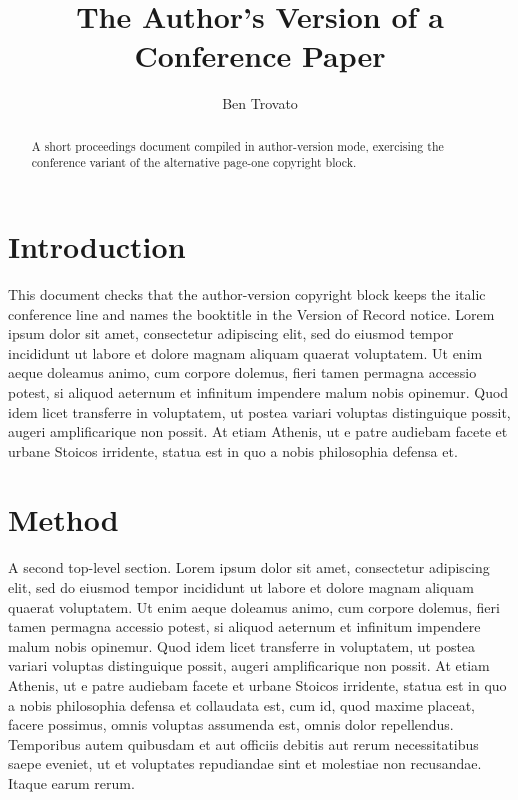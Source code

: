 \documentclass[sigconf,authorversion]{acmart}
\begin{document}
\title{The Author's Version of a Conference Paper}

\author{Ben Trovato}

\renewcommand{\shortauthors}{Trovato}

\begin{abstract}
  A short proceedings document compiled in author-version mode, exercising the
  conference variant of the alternative page-one copyright block.
\end{abstract}

\maketitle

\section{Introduction}
This document checks that the author-version copyright block keeps the italic
conference line and names the booktitle in the Version of Record notice. Lorem
ipsum dolor sit amet, consectetur adipiscing elit, sed do eiusmod tempor
incididunt ut labore et dolore magnam aliquam quaerat voluptatem. Ut enim aeque
doleamus animo, cum corpore dolemus, fieri tamen permagna accessio potest, si
aliquod aeternum et infinitum impendere malum nobis opinemur. Quod idem licet
transferre in voluptatem, ut postea variari voluptas distinguique possit, augeri
amplificarique non possit. At etiam Athenis, ut e patre audiebam facete et urbane
Stoicos irridente, statua est in quo a nobis philosophia defensa et.

\section{Method}
A second top-level section. Lorem ipsum dolor sit amet, consectetur adipiscing
elit, sed do eiusmod tempor incididunt ut labore et dolore magnam aliquam quaerat
voluptatem. Ut enim aeque doleamus animo, cum corpore dolemus, fieri tamen
permagna accessio potest, si aliquod aeternum et infinitum impendere malum nobis
opinemur. Quod idem licet transferre in voluptatem, ut postea variari voluptas
distinguique possit, augeri amplificarique non possit. At etiam Athenis, ut e
patre audiebam facete et urbane Stoicos irridente, statua est in quo a nobis
philosophia defensa et collaudata est, cum id, quod maxime placeat, facere
possimus, omnis voluptas assumenda est, omnis dolor repellendus. Temporibus autem
quibusdam et aut officiis debitis aut rerum necessitatibus saepe eveniet, ut et
voluptates repudiandae sint et molestiae non recusandae. Itaque earum rerum.
\end{document}

